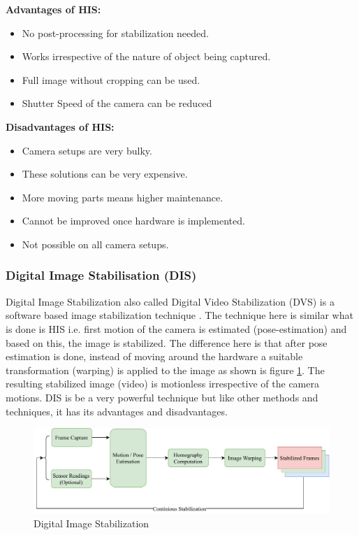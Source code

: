 \textbf{Advantages of HIS: }

\begin{itemize}
\item No post-processing for stabilization needed.
\item Works irrespective of the nature of object being captured.
\item Full image without cropping can be used.
\item Shutter Speed of the camera can be reduced
\end{itemize}

\textbf{Disadvantages of HIS:}
\begin{itemize}
\item Camera setups are very bulky.
\item These solutions can be very expensive.
\item More moving parts means higher maintenance.
\item Cannot be improved once hardware is implemented.
\item Not possible on all camera setups.
\end{itemize}

\subsubsection{Digital Image Stabilisation (DIS)}
Digital Image Stabilization also called Digital Video Stabilization (DVS) is a software based image stabilization technique \citep{dis_review}. The technique here is similar what is done is HIS i.e. first motion of the camera is estimated (pose-estimation) and based on this, the image is stabilized. The difference here is that after pose estimation is done, instead of moving around the hardware a suitable transformation (warping) is applied to the image \citep{dis_feat_track} as shown is figure \ref{fig:dis}. The resulting stabilized image (video) is motionless irrespective of the camera motions. DIS is be a very powerful technique but like other methods and techniques, it has its advantages and disadvantages.

\begin{figure}[H]
\centering
\includegraphics[scale=0.6]{images/fig_chapter2/2_1_dis.pdf}
\caption{Digital Image Stabilization}
\label{fig:dis}
\end{figure}

